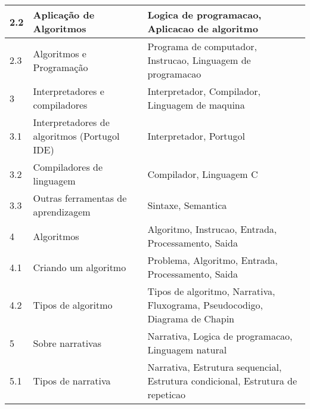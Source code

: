 \begin{longtable}{| p{} | p{} | p{} |}
2.2      & Aplicação de Algoritmos                                  & Logica de programacao, Aplicacao de algoritmo                                                                                 \\ \hline
2.3      & Algoritmos e Programação                                 & Programa de computador, Instrucao, Linguagem de programacao                                                                   \\ \hline
3        & Interpretadores e compiladores                           & Interpretador, Compilador, Linguagem de maquina                                                                               \\ \hline
3.1      & Interpretadores de algoritmos (Portugol IDE)             & Interpretador, Portugol                                                                                                       \\ \hline
3.2      & Compiladores de linguagem                                & Compilador, Linguagem C                                                                                                       \\ \hline
3.3      & Outras ferramentas de aprendizagem                       & Sintaxe, Semantica                                                                                                            \\ \hline
4        & Algoritmos                                               & Algoritmo, Instrucao, Entrada, Processamento, Saida                                                                           \\ \hline
4.1      & Criando um algoritmo                                     & Problema, Algoritmo, Entrada, Processamento, Saida                                                                            \\ \hline
4.2      & Tipos de algoritmo                                       & Tipos de algoritmo, Narrativa, Fluxograma, Pseudocodigo, Diagrama de Chapin                                                   \\ \hline
5        & Sobre narrativas                                         & Narrativa, Logica de programacao, Linguagem natural                                                                           \\ \hline
5.1      & Tipos de narrativa                                       & Narrativa, Estrutura sequencial, Estrutura condicional, Estrutura de repeticao                                                \\ \hline

\end{longtable}
